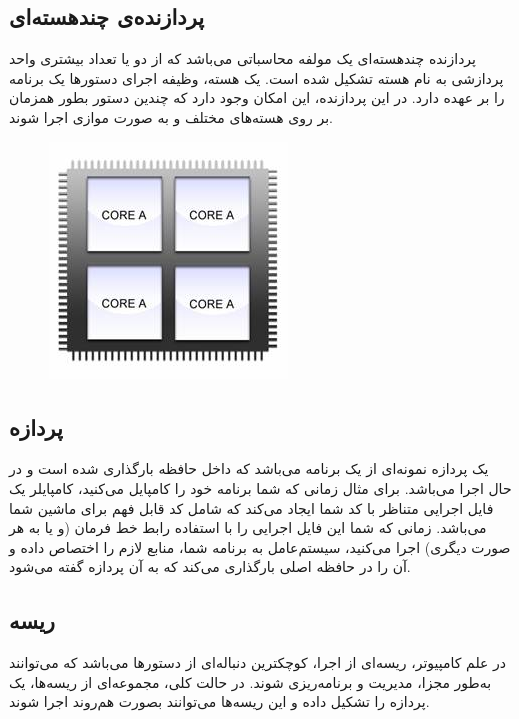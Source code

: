 \documentclass{utap}
\begin{document}
		\subsection{پردازنده‌ی چندهسته‌ای\protect{}} %
		\hspace{5mm}
پردازنده چند‌هسته‌ای یک مولفه محاسباتی  می‌باشد که از دو یا تعداد بیشتری واحد پردازشی به نام هسته تشکیل شده است. یک هسته، وظیفه اجرای دستورها یک برنامه را بر عهده دارد. در این پردازنده، این امکان وجود دارد که چندین دستور بطور همزمان بر روی هسته‌های مختلف و به صورت موازی اجرا شوند.
		\begin{figure}[H]
			\centering
			\includegraphics[width=0.30 \textwidth]{MultiCore.jpg}     
		\end{figure}
	
		\subsection{پردازه\protect{}} %
		\hspace{5mm}
	یک پردازه نمونه‌ای از یک برنامه می‌باشد که داخل حافظه بارگذاری شده است و در حال اجرا می‌باشد. برای مثال زمانی که شما برنامه‌ خود را کامپایل می‌کنید، کامپایلر یک فایل اجرایی متناظر با کد شما ایجاد می‌کند که شامل کد قابل فهم برای ماشین شما می‌باشد. زمانی که شما این فایل اجرایی را با استفاده رابط خط فرمان (و یا به هر صورت دیگری) اجرا می‌کنید،‌ سیستم‌عامل به برنامه شما، منابع لازم را اختصاص داده و آن را در حافظه اصلی بارگذاری می‌کند که به آن پردازه گفته می‌شود.

		\subsection{ریسه\protect{}} %
		\hspace{5mm}
	در علم کامپیوتر، ریسه‌ای از اجرا، کوچکترین دنباله‌ای از دستورها می‌باشد که می‌توانند به‌طور مجزا، مدیریت و برنامه‌ریزی شوند. در حالت کلی، مجموعه‌ای از ریسه‌ها، یک پردازه را تشکیل داده و این ریسه‌‌ها می‌توانند بصورت هم‌روند اجرا شوند.
	
\end{document}
